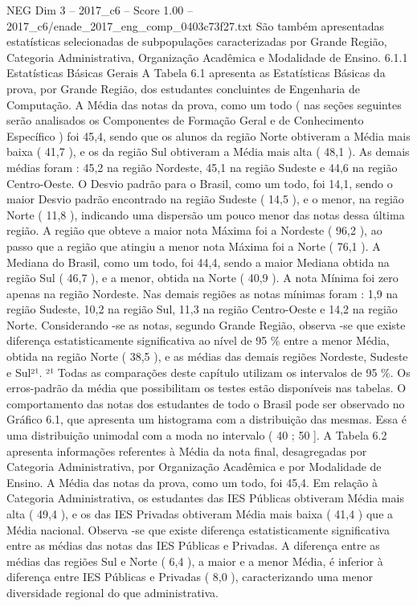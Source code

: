\begin{textsample}{NEG Dim 3 – 2017\_c6 – Score 1.00 – 2017\_c6/enade\_2017\_eng\_comp\_0403c73f27.txt}
São também apresentadas estatísticas selecionadas de subpopulações caracterizadas por Grande Região, Categoria Administrativa, Organização Acadêmica e Modalidade de Ensino. 6.1.1 Estatísticas Básicas Gerais A Tabela 6.1 apresenta as Estatísticas Básicas da prova, por Grande Região, dos estudantes concluintes de Engenharia de Computação.
A Média das notas da prova, como um todo ( nas seções seguintes serão analisados os Componentes de Formação Geral e de Conhecimento Específico ) foi 45,4, sendo que os alunos da região Norte obtiveram a Média mais baixa ( 41,7 ), e os da região Sul obtiveram a Média mais alta ( 48,1 ).
As demais médias foram : 45,2 na região Nordeste, 45,1 na região Sudeste e 44,6 na região Centro-Oeste.
O Desvio padrão para o Brasil, como um todo, foi 14,1, sendo o maior Desvio padrão encontrado na região Sudeste ( 14,5 ), e o menor, na região Norte ( 11,8 ), indicando uma dispersão um pouco menor das notas dessa última região.
A região que obteve a maior nota Máxima foi a Nordeste ( 96,2 ), ao passo que a região que atingiu a menor nota Máxima foi a Norte ( 76,1 ).
A Mediana do Brasil, como um todo, foi 44,4, sendo a maior Mediana obtida na região Sul ( 46,7 ), e a menor, obtida na Norte ( 40,9 ).
A nota Mínima foi zero apenas na região Nordeste.
Nas demais regiões as notas mínimas foram : 1,9 na região Sudeste, 10,2 na região Sul, 11,3 na região Centro-Oeste e 14,2 na região Norte.
Considerando -se as notas, segundo Grande Região, observa -se que existe diferença estatisticamente significativa ao nível de 95 \% entre a menor Média, obtida na região Norte ( 38,5 ), e as médias das demais regiões Nordeste, Sudeste e Sul²¹. ²¹ Todas as comparações deste capítulo utilizam os intervalos de 95 \%.
Os erros-padrão da média que possibilitam os testes estão disponíveis nas tabelas.
O comportamento das notas dos estudantes de todo o Brasil pode ser observado no Gráfico 6.1, que apresenta um histograma com a distribuição das mesmas.
Essa é uma distribuição unimodal com a moda no intervalo ( 40 ; 50 ].
A Tabela 6.2 apresenta informações referentes à Média da nota final, desagregadas por Categoria Administrativa, por Organização Acadêmica e por Modalidade de Ensino.
A Média das notas da prova, como um todo, foi 45,4.
Em relação à Categoria Administrativa, os estudantes das IES Públicas obtiveram Média mais alta ( 49,4 ), e os das IES Privadas obtiveram Média mais baixa ( 41,4 ) que a Média nacional.
Observa -se que existe diferença estatisticamente significativa entre as médias das notas das IES Públicas e Privadas.
A diferença entre as médias das regiões Sul e Norte ( 6,4 ), a maior e a menor Média, é inferior à diferença entre IES Públicas e Privadas ( 8,0 ), caracterizando uma menor diversidade regional do que administrativa.

\end{textsample}
